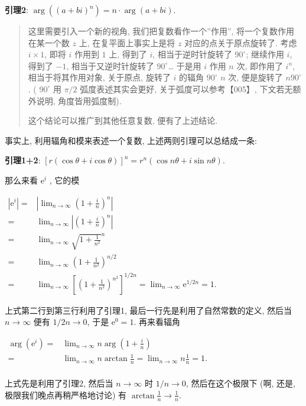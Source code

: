 \textbf{引理2}: \(\boxed{\arg((a+bi)^n)=n\cdot\arg(a+bi)}\).

\begin{quote}
这里需要引入一个新的视角, 我们把复数看作一个''作用'',
将一个复数作用在某一个数 \(z\) 上, 在复平面上事实上是将 \(z\)
对应的点关于原点旋转了. 考虑 \(i\times1\), 即将 \(i\) 作用到 \(1\) 上,
得到了 \(i\), 相当于逆时针旋转了 \(90^\circ\); 继续作用 \(i\), 得到了
\(-1\), 相当于又逆时针旋转了 \(90^\circ\)\ldots{} 于是用 \(i\) 作用
\(n\) 次, 即作用了 \(i^n\), 相当于将其作用对象, 关于原点, 旋转了 \(i\)
的辐角 \(90^\circ\) \(n\) 次, 便是旋转了 \(n90^\circ\). ( \(90^\circ\)
用 \(\pi/2\) 弧度表述其实会更好, 关于弧度可以参考【005】,
下文若无额外说明, 角度皆用弧度制).

这个结论可以推广到其他任意复数, 便有了上述结论.
\end{quote}

事实上, 利用辐角和模来表述一个复数, 上述两则引理可以总结成一条:

\textbf{引理1+2}:
\(\boxed{\left[r(\cos\theta+i\cos\theta)\right]^n=r^n(\cos n\theta+i\sin n\theta)}\).

那么来看 \(\mathrm{e}^i\) , 它的模

\(\begin{aligned} |\mathrm{e}^i|=&\left|\lim_{n\rightarrow\infty}\left(1+\frac{i}{n}\right)^n\right|\\ =&\lim_{n\rightarrow\infty}\left|\left(1+\frac{i}{n}\right)^n\right|\\ =&\lim_{n\rightarrow\infty}\sqrt{1+\frac{1}{n^2}}^n\\ =&\lim_{n\rightarrow\infty}\left(1+\frac{1}{n^2}\right)^{n/2}\\ =&\lim_{n\rightarrow\infty}\left[\left(1+\frac{1}{n^2}\right)^{n^2}\right]^{1/2n}=\lim_{n\rightarrow\infty}\mathrm{e}^{1/2n}=1. \end{aligned}\)

上式第二行到第三行利用了引理1, 最后一行先是利用了自然常数的定义, 然后当
\(n\rightarrow\infty\) 便有 \(1/2n\rightarrow0\), 于是
\(\mathrm{e}^0=1\). 再来看辐角

\(\begin{aligned} \arg(\mathrm{e}^i)=&\lim_{n\rightarrow\infty}n\arg\left(1+\frac{i}{n}\right)\\ =&\lim_{n\rightarrow\infty}n\arctan\frac{1}{n}=\lim_{n\rightarrow\infty}n\frac{1}{n}=1.\\ \end{aligned}\)

上式先是利用了引理2, 然后当 \(n\rightarrow\infty\) 时
\(1/n\rightarrow0\), 然后在这个极限下 (啊, 还是,
极限我们晚点再稍严格地讨论) 有
\(\arctan\frac{1}{n}\rightarrow\frac{1}{n}\).

